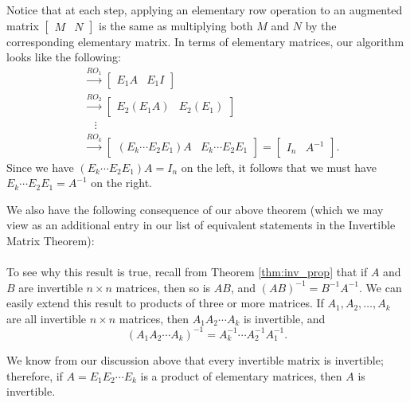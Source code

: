 Notice that at each step, applying an elementary row operation to an augmented matrix $[\begin{array}{c|c} M&N\end{array}]$ is the same as multiplying both $M$ and $N$ by the corresponding elementary matrix. In terms of elementary matrices, our algorithm looks like the following:
\begin{align*}
[\begin{array}{c|c} E&I\end{array}] &\xrightarrow{RO_1} [\begin{array}{c|c} E_1A&E_1I\end{array}]\\
&\xrightarrow{RO_2} [\begin{array}{c|c} E_2(E_1A) & E_2(E_1)\end{array}] \tag{Note $E_1I=E_1$}\\
& \quad \vdots\\
& \xrightarrow{RO_k} [\begin{array}{c|c} (E_k\cdots E_2E_1)A & E_k\cdots E_2E_1\end{array}] = [\begin{array}{c|c} I_n & A^{-1}\end{array}].
\end{align*}
Since we have $(E_k\cdots E_2E_1)A=I_n$ on the left, it follows that we must have $E_k\cdots E_2E_1 = A^{-1}$ on the right.

We also have the following consequence of our above theorem (which we may view as an additional entry in our list of equivalent statements in the Invertible Matrix Theorem):\\

\\

To see why this result is true, recall from Theorem \ref{thm:inv_prop} that if $A$ and $B$ are invertible $n\times n$ matrices, then so is $AB$, and $(AB)^{-1} = B^{-1}A^{-1}$. We can easily extend this result to products of three or more matrices. If $A_1, A_2, \ldots, A_k$ are all invertible $n\times n$ matrices, then $A_1A_2\cdots A_k$ is invertible, and
\[
(A_1A_2\cdots A_k)^{-1} = A_k^{-1}\cdots A_2^{-1}A_1^{-1}.
\]

We know from our discussion above that every invertible matrix is invertible; therefore, if $A=E_1E_2\cdots E_k$ is a product of elementary matrices, then $A$ is invertible.

